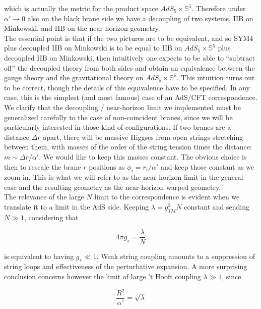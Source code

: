 which is actually the metric for the product space $AdS_5 \times \mathbb{S}^5$. Therefore under $\alpha' \rightarrow 0$ also on the black brane side we have a decoupling of two systems, IIB on Minkowski, and IIB on the near-horizon geometry.\\

The essential point is that if the two pictures are to be equivalent, and so SYM4 plus decoupled IIB on Minkowski is to be equal to IIB on $AdS_5 \times \mathbb{S}^5$ plus decoupled IIB on Minkowski, then intuitively one expects to be able to ``subtract off'' the decoupled theory from both sides and obtain an equivalence between the gauge theory and the gravitational theory on $AdS_5 \times \mathbb{S}^5$. This intuition turns out to be correct, though the details of this equivalence have to be specified. In any case, this is the simplest (and most famous) case of an AdS/CFT correspondence.\\

We clarify that the decoupling / near-horizon limit we implemented must be generalized carefully to the case of non-coincident branes, since we will be particularly interested in those kind of configurations. If two branes are a distance $\Delta r$ apart, there will be massive Higgses from open strings stretching between them, with masses of the order of the string tension times the distance: $m \sim \Delta r / \alpha'$. We would like to keep this masses constant. The obvious choice is then to rescale the brane $r$ positions as $\phi_i = r_i / \alpha'$ and keep those constant as we zoom in. This is what we will refer to as the near-horizon limit in the general case and the resulting geometry as the near-horizon warped geometry.\\

The relevance of the large $N$ limit to the correspondence is evident when we translate it to a limit in the AdS side. Keeping $\lambda = g_{YM}^2 N$ constant and sending $N \gg 1$, considering that

\begin{equation}
	4\pi g_s = \frac{\lambda}{N}
	\label{}
\end{equation}

is equivalent to having $g_s \ll 1$. Weak string coupling amounts to a suppression of string loops and effectiveness of the perturbative expansion. A more surprising conclusion concerns however the limit of large 't Hooft coupling $\lambda \gg 1$, since

\begin{equation}
	\frac{R^2}{\alpha'} = \sqrt \lambda
	\label{}
\end{equation}

